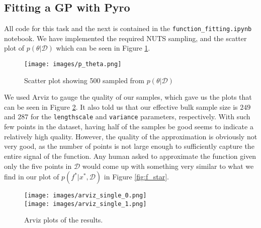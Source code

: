 \subsection{Fitting a GP with Pyro}
All code for this task and the next is contained in the \texttt{function\_fitting.ipynb} notebook. We have implemented the required NUTS sampling, and the scatter plot of $p(\theta | \mathcal{D})$ which can be seen in Figure \ref{fig:p_theta}.
\begin{figure}[H]
\centering
\texttt{[image: images/p\_theta.png]}
\caption{Scatter plot showing 500 sampled from $p(\theta | \mathcal{D})$}
\label{fig:p_theta}
\end{figure}

We used Arviz to gauge the quality of our samples, which gave us the plots that can be seen in Figure \ref{fig:arviz_old}. It also told us that our effective bulk sample size is $249$ and $287$ for the \texttt{lengthscale} and \texttt{variance} parameters, respectively. With such few points in the dataset, having half of the samples be good seems to indicate a relatively high quality. However, the quality of the approximation is obviously not very good, as the number of points is not large enough to sufficiently capture the entire signal of the function. Any human asked to approximate the function given only the five points in $\mathcal{D}$ would come up with something very similar to what we find in our plot of $p(f^*|x^*,\mathcal{D})$ in Figure \ref{fig:f_star}.

\begin{figure}[H]
\centering
\texttt{[image: images/arviz\_single\_0.png]}\\
\texttt{[image: images/arviz\_single\_1.png]}
\caption{Arviz plots of the results.}
\label{fig:arviz_old}
\end{figure}



